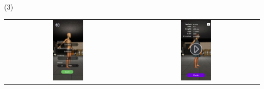 \begin{frame}{ (3)}
\begin{center}
     \begin{tabular}{cc}
         \includegraphics[width=0.25\textwidth]{Figs/Echartea4}&
         \includegraphics[width=0.25\textwidth]{Figs/Echartea5}
          \end{tabular}
\end{center}
\end{frame}

